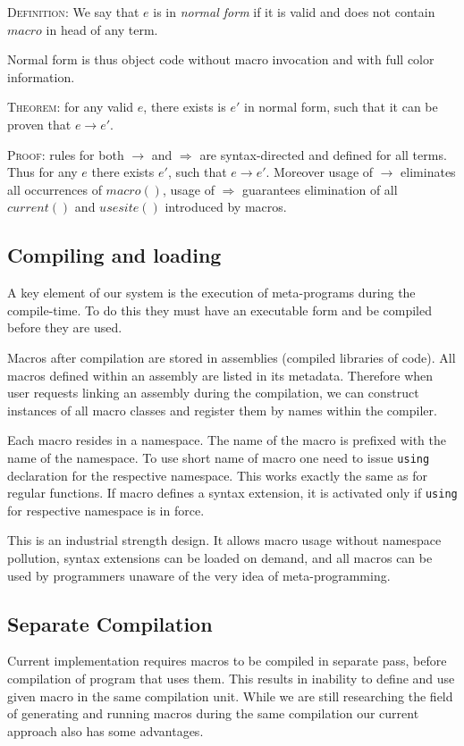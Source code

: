 \documentclass{llncs}
\begin{document}
\textsc{Definition}: We say that $e$ is in \emph{normal form} if it is
valid and does not contain $macro$ in head of any term.

Normal form is thus object code without macro invocation and with full
color information.

\textsc{Theorem}: for any valid $e$, there exists is $e'$ in normal form,
such that it can be proven that $e \rightarrow e'$.

\textsc{Proof}: rules for both $\rightarrow$ and $\Rightarrow$ are
syntax-directed and defined for all terms. Thus for any $e$ there exists
$e'$, such that $e \rightarrow e'$. Moreover usage of $\rightarrow$
eliminates all occurrences of $macro()$, usage of $\Rightarrow$ guarantees
elimination of all $current()$ and $usesite()$ introduced by macros.

\subsection{Compiling and loading}
A key element of our system is the execution of meta-programs during 
the compile-time. To do this they must have an executable form and be
compiled before they are used.

Macros after compilation are stored in assemblies (compiled libraries
of code). All macros defined within an assembly are listed in its metadata.
Therefore when user requests linking an assembly during the compilation,
we can construct instances of all macro classes and register them by
names within the compiler.

Each macro resides in a namespace. The name of the macro is prefixed
with the name of the namespace. To use short name of macro one need
to issue \verb,using, declaration for the respective namespace. This
works exactly the same as for regular functions. If macro defines a
syntax extension, it is activated only if \verb,using, for respective
namespace is in force.

This is an industrial strength design. It allows macro usage without namespace
pollution, syntax extensions can be loaded on demand, and all macros
can be used by programmers unaware of the very idea of meta-programming.

\subsection{Separate Compilation}
Current implementation requires macros to be compiled in separate pass,
before compilation of program that uses them. This results in inability
to define and use given macro in the same compilation unit. While we
are still researching the field of generating and running macros during
the same compilation our current approach also has some advantages.
\end{document}
